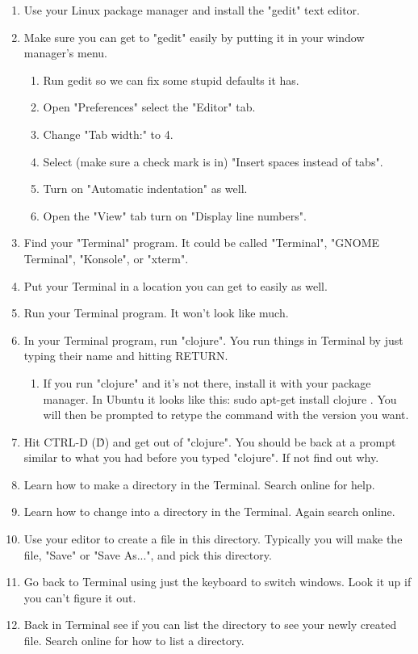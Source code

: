 \begin{enumerate}	
\item Use your Linux package manager and install the "gedit" text editor.
\item Make sure you can get to "gedit" easily by putting it in your window manager's menu.
	\begin{enumerate}
	\item Run gedit so we can fix some stupid defaults it has.
   	\item Open "Preferences" select the "Editor" tab.
   	\item Change "Tab width:" to 4.
   	\item Select (make sure a check mark is in) "Insert spaces instead of tabs".
   	\item Turn on "Automatic indentation" as well.
   	\item Open the "View" tab turn on "Display line numbers".
   	\end{enumerate}
	
\item Find your "Terminal" program.  It could be called "Terminal", "GNOME Terminal", "Konsole", or "xterm".
\item Put your Terminal in a location you can get to easily as well.
\item Run your Terminal program.  It won't look like much.
	
\item In your Terminal program, run "clojure".  You run things in Terminal by just typing their name and hitting RETURN.
	\begin{enumerate}
	\item If you run "clojure" and it's not there, install it with your package manager. In Ubuntu it looks like this: sudo apt-get install clojure . You will then be prompted to retype the command with the version you want.  
	\end{enumerate}
	
\item Hit CTRL-D (\^D) and get out of "clojure". You should be back at a prompt similar to what you had before you typed "clojure".  If not find out why.
\item Learn how to make a directory in the Terminal. Search online for help.
\item Learn how to change into a directory in the Terminal.  Again search online.
\item Use your editor to create a file in this directory.  Typically you
will make the file, "Save" or "Save As...", and pick this directory.
\item Go back to Terminal using just the keyboard to switch windows.  Look it up if you can't figure it out.
\item Back in Terminal see if you can list the directory to see your newly created file.  Search online for how to list a directory.
\end{enumerate}	
	
